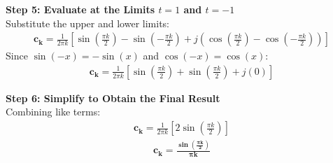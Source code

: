 \documentclass[journal,12pt,onecolumn]{IEEEtran}
\newcommand{\brak}[1]{\left(#1\right)}
\theoremstyle{remark}
\begin{document}
\vspace{0.3cm}
\noindent \textbf{Step 5: Evaluate at the Limits $t = 1$ and $t = -1$} \\
Substitute the upper and lower limits:
\begin{align}
\mathbf{c_k} = \frac{1}{2\pi k} \left[ \sin\brak{\frac{\pi k}{2}} - \sin\brak{-\frac{\pi k}{2}} + j \left( \cos\brak{\frac{\pi k}{2}} - \cos\brak{-\frac{\pi k}{2}} \right) \right]
\end{align}
Since $\sin\brak{-x} = -\sin\brak{x}$ and $\cos\brak{-x} = \cos\brak{x}$:
\begin{align}
\mathbf{c_k} = \frac{1}{2\pi k} \left[ \sin\brak{\frac{\pi k}{2}} + \sin\brak{\frac{\pi k}{2}} + j\brak{0} \right]
\end{align}

\vspace{0.3cm}
\noindent \textbf{Step 6: Simplify to Obtain the Final Result} \\
Combining like terms:
\begin{align}
\mathbf{c_k} = \frac{1}{2\pi k} \left[ 2 \sin\brak{\frac{\pi k}{2}} \right]
\end{align}
\begin{align}
\mathbf{c_k = \frac{\sin\brak{\frac{\pi k}{2}}}{\pi k}}
\end{align}
\end{document}
